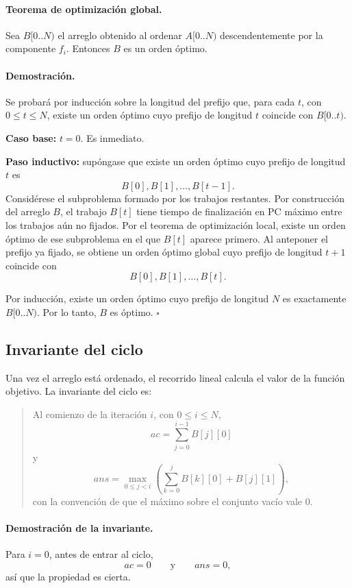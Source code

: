 \documentclass[11pt]{article}
\begin{document}
\paragraph{Teorema de optimización global.}
Sea \(B[0..N)\) el arreglo obtenido al ordenar \(A[0..N)\) descendentemente por
la componente \(f_i\). Entonces \(B\) es un orden óptimo.

\paragraph{Demostración.}
Se probará por inducción sobre la longitud del prefijo que, para cada
\(t\), con \(0\leq t\leq N\), existe un orden óptimo cuyo prefijo de longitud \(t\) coincide
con \(B[0..t)\).

\textbf{Caso base:} \(t=0\). Es inmediato.

\textbf{Paso inductivo:} supóngase que existe un orden óptimo cuyo prefijo de longitud
\(t\) es
\[
B[0],B[1],\dots,B[t-1].
\]
Considérese el subproblema formado por los trabajos restantes. Por construcción del
arreglo \(B\), el trabajo \(B[t]\) tiene tiempo de finalización en PC máximo entre los
trabajos aún no fijados. Por el teorema de optimización local, existe un orden óptimo
de ese subproblema en el que \(B[t]\) aparece primero. Al anteponer el prefijo ya fijado,
se obtiene un orden óptimo global cuyo prefijo de longitud \(t+1\) coincide con
\[
B[0],B[1],\dots,B[t].
\]

Por inducción, existe un orden óptimo cuyo prefijo de longitud \(N\) es exactamente
\(B[0..N)\). Por lo tanto, \(B\) es óptimo. \(\square\)

\subsection*{Invariante del ciclo}

Una vez el arreglo está ordenado, el recorrido lineal calcula el valor de la función
objetivo. La invariante del ciclo es:

\begin{quote}
Al comienzo de la iteración \(i\), con \(0\leq i\leq N\),
\[
ac=\sum_{j=0}^{i-1} B[j][0]
\]
y
\[
ans=\max_{0\leq j<i}\left(\sum_{k=0}^{j} B[k][0] + B[j][1]\right),
\]
con la convención de que el máximo sobre el conjunto vacío vale \(0\).
\end{quote}

\paragraph{Demostración de la invariante.}
Para \(i=0\), antes de entrar al ciclo,
\[
ac=0
\qquad\text{y}\qquad
ans=0,
\]
así que la propiedad es cierta.
\end{document}
